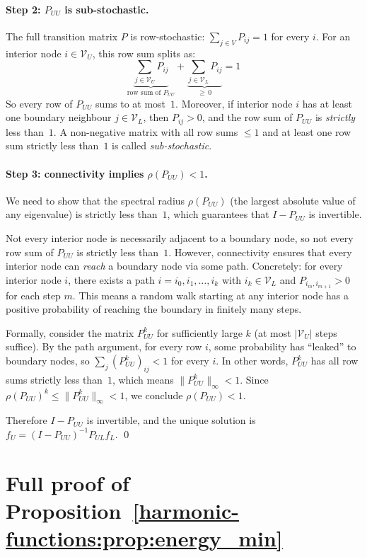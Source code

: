 \begin{notechapter}
\paragraph{Step 2: $P_{UU}$ is sub-stochastic.} The full transition matrix $P$
is row-stochastic: $\sum_{j \in V} P_{ij} = 1$ for every $i$. For an
interior node $i \in \mathcal{V}_U$, this row sum splits as:
\[
\underbrace{\sum_{j \in \mathcal{V}_U} P_{ij}}_{\text{row sum of }P_{UU}}
+ \underbrace{\sum_{j \in \mathcal{V}_L} P_{ij}}_{\geq\, 0} = 1
\]
So every row of $P_{UU}$ sums to at most~$1$. Moreover, if interior node
$i$ has at least one boundary neighbour $j \in \mathcal{V}_L$, then
$P_{ij} > 0$, and the row sum of $P_{UU}$ is \emph{strictly} less than~$1$.
A non-negative matrix with all row sums $\leq 1$ and at least one row sum
strictly less than~$1$ is called \emph{sub-stochastic}.

\paragraph{Step 3: connectivity implies $\rho(P_{UU}) < 1$.} We need to show
that the spectral radius $\rho(P_{UU})$ (the largest absolute value of any
eigenvalue) is strictly less than~$1$, which guarantees that $I - P_{UU}$ is
invertible.

Not every interior node is necessarily adjacent to a boundary node, so not
every row sum of $P_{UU}$ is strictly less than~$1$. However, connectivity
ensures that every interior node can \emph{reach} a boundary node via some
path. Concretely: for every interior node $i$, there exists a path
$i = i_0, i_1, \ldots, i_k$ with $i_k \in \mathcal{V}_L$ and
$P_{i_m, i_{m+1}} > 0$ for each step $m$. This means a random walk starting
at any interior node has a positive probability of reaching the boundary in
finitely many steps.

Formally, consider the matrix $P_{UU}^k$ for sufficiently large $k$ (at most
$|\mathcal{V}_U|$ steps suffice). By the path argument, for every row $i$,
some probability has ``leaked'' to boundary nodes, so
$\sum_j (P_{UU}^k)_{ij} < 1$ for every $i$. In other words, $P_{UU}^k$ has
all row sums strictly less than~$1$, which means
$\|P_{UU}^k\|_\infty < 1$. Since $\rho(P_{UU})^k \leq \|P_{UU}^k\|_\infty
< 1$, we conclude $\rho(P_{UU}) < 1$.

Therefore $I - P_{UU}$ is invertible, and the unique solution is
$f_U = (I - P_{UU})^{-1}P_{UL}f_L$. \qed

\section{Full proof of Proposition~\ref{harmonic-functions:prop:energy_min}}
\label{harmonic-functions:app:proof_energy}


\end{notechapter}
